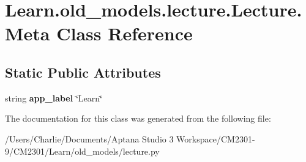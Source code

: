 \hypertarget{class_learn_1_1old__models_1_1lecture_1_1_lecture_1_1_meta}{\section{Learn.\-old\-\_\-models.\-lecture.\-Lecture.\-Meta Class Reference}
\label{class_learn_1_1old__models_1_1lecture_1_1_lecture_1_1_meta}
}
\subsection*{Static Public Attributes}
\begin{DoxyCompactItemize}
\item 
\hypertarget{class_learn_1_1old__models_1_1lecture_1_1_lecture_1_1_meta_ade4be4e3ca571b9115a7b92548c4faab}{string {\bfseries app\-\_\-label} \char`\"{}Learn\char`\"{}}\label{class_learn_1_1old__models_1_1lecture_1_1_lecture_1_1_meta_ade4be4e3ca571b9115a7b92548c4faab}

\end{DoxyCompactItemize}


The documentation for this class was generated from the following file\-:\begin{DoxyCompactItemize}
\item 
/\-Users/\-Charlie/\-Documents/\-Aptana Studio 3 Workspace/\-C\-M2301-\/9/\-C\-M2301/\-Learn/old\-\_\-models/lecture.\-py\end{DoxyCompactItemize}
